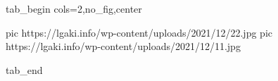 
 
 
 
 

\ifcmt
  tab_begin cols=2,no_fig,center

     pic https://lgaki.info/wp-content/uploads/2021/12/22.jpg
		 pic https://lgaki.info/wp-content/uploads/2021/12/11.jpg

  tab_end
\fi
